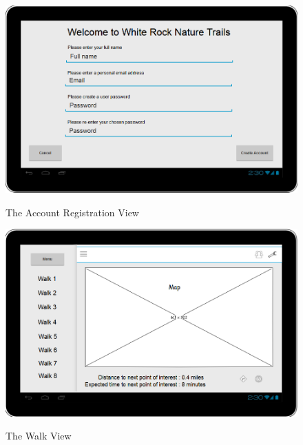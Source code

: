 \documentclass[11pt,a4paper]{article}
\begin{document}
\begin{figure}[H]
\begin{center}
\includegraphics[scale=0.5]{Register.png}
\label{fig:registerView}
\caption{The Account Registration View}
\end{center}
\end{figure}

\begin{figure}[H]
\begin{center}
\includegraphics[scale=0.5]{WalkView.png}
\label{fig:walkView}
\caption{The Walk View}
\end{center}
\end{figure}


\newpage


\end{document}
